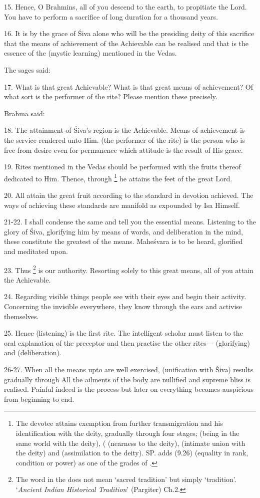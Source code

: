 15. Hence, O Brahmins, all of you descend to the earth, to propitiate the Lord.
You have to perform a sacrifice of long duration for a thousand years.

16. It is by the grace of Śiva alone who will be the presiding deity of this
sacrifice that the means of achievement of the Achievable can be realised and
that is the essence of the  (mystic learning) mentioned in the Vedas.

The sages said:

17. What is that great Achievable? What is that great means of achievement? Of
what sort is the performer of the rite? Please mention these precisely.

Brahmā said:

18. The attainment of Śiva’s region is the Achievable. Means of achievement is
the service rendered unto Him.  (the performer of the rite) is
the person who is free from desire even for permanence which attitude is
the result of His grace.

19. Rites mentioned in the Vedas should be performed with the fruits thereof
dedicated to Him. Thence, through \footnote{The devotee attains
exemption from further transmigration and his identification with the deity,
gradually through four stages; \viz {} (being in the same world with
the deity), ( (nearness to the deity),  (intimate union
with the deity) and  (assimilation to the deity). SP. adds
 (9.26) (equality in rank, condition or power) as one of the grades
of .} he attains the feet of the great Lord.

20. All attain the great fruit according to the standard in devotion achieved.
The ways of achieving these standards are manifold as expounded by Isa Himself.

21-22. I shall condense the same and tell you the essential means. Listening to
the glory of Śiva, glorifying him by means of words, and deliberation in
the mind, these constitute the greatest of the means. Maheśvara is to be heard,
glorified and meditated upon.

23. Thus \footnote{The word  in the  does not mean
‘sacred tradition’ but simply ‘tradition’. ‘\emph{Ancient Indian
Historical Tradition}’ (Pargiter) Ch.2.} is our authority. Resorting solely to
this great means, all of you attain the Achievable.

24. Regarding visible things people see with their eyes and begin their activity.
Concerning the invisible everywhere, they know through the ears and activise
themselves.

25. Hence  (listening) is the first rite. The intelligent scholar
must listen to the oral explanation of the preceptor and then practise the
other rites— (glorifying) and  (deliberation).

26-27. When all the means upto  are well exercised, 
(unification with Śiva) results gradually through  \etc All
the ailments of the body are nullified and supreme bliss is realised. Painful
indeed is the process but later on everything becomes auspicious from beginning
to end.
